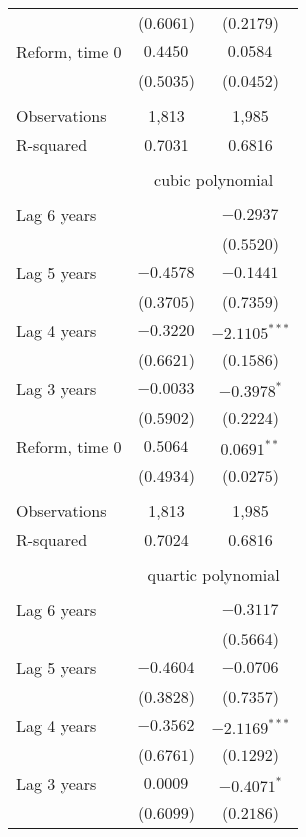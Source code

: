 \begin{table}[htbp]
{\begin{tabular}{lcc}
&     ($0.6061$) &    ($0.2179$)  \\
Reform, time 0 &    $ 0.4450^{} $ &     $ 0.0584^{} $\\
&     ($0.5035$) &    ($0.0452$)  \\
\\
Observations        &              1,813    &              1,985 \\
R-squared        &          0.7031  &          0.6816 \\
\\
& \multicolumn{2}{c}{cubic polynomial} \\
\cmidrule(lrr){2-3} \\
Lag 6 years &      &     $ -0.2937^{} $  \\
&     &    ($0.5520$)  \\
Lag 5 years &     $ -0.4578^{} $ &       $ -0.1441^{} $  \\
&     ($0.3705$) &    ($0.7359$)  \\
Lag 4 years &     $ -0.3220^{} $ &       $ -2.1105^{***} $\\
&     ($0.6621$) &    ($0.1586$)  \\
Lag 3 years &     $ -0.0033^{} $  &     $ -0.3978^{*} $ \\
&     ($0.5902$) &    ($0.2224$)  \\
Reform, time 0 &    $ 0.5064^{} $ &     $ 0.0691^{**} $\\
&     ($0.4934$) &    ($0.0275$)  \\
\\
Observations        &              1,813    &              1,985 \\
R-squared        &          0.7024  &          0.6816 \\
\\
& \multicolumn{2}{c}{quartic polynomial} \\
\cmidrule(lrr){2-3} \\
Lag 6 years &      &     $ -0.3117^{} $  \\
&      &    ($0.5664$)  \\
Lag 5 years &     $ -0.4604^{} $ &       $ -0.0706^{} $  \\
&     ($0.3828$) &    ($0.7357$)  \\
Lag 4 years &     $ -0.3562^{} $ &       $ -2.1169^{***} $\\
&     ($0.6761$) &    ($0.1292$)  \\
Lag 3 years &     $ 0.0009^{} $  &     $ -0.4071^{*} $ \\
&     ($0.6099$) &    ($0.2186$)  \\

\end{tabular}}
\end{table}
